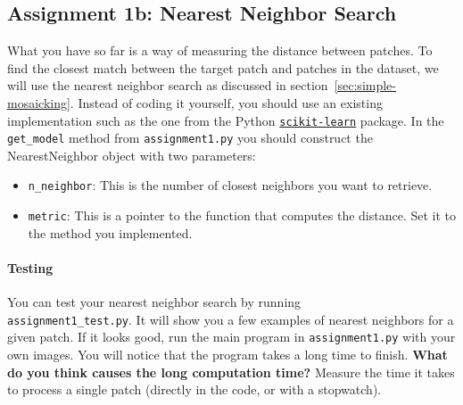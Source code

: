 \documentclass[a4paper]{article}
\begin{document}
	\subsection{Assignment 1b: Nearest Neighbor Search}
		What you have so far is a way of measuring the distance between patches.
		To find the closest match between the target patch and patches in the dataset, we will use the nearest neighbor search as discussed in section~\ref{sec:simple-mosaicking}. 
		Instead of coding it yourself, you should use an existing implementation such as the one from the Python 
		\href{http://scikit-learn.org/stable/modules/neighbors.html}{\texttt{scikit-learn}} package.
		In the \verb|get_model| method from \verb|assignment1.py| you should construct the NearestNeighbor object with two parameters:
		\begin{itemize}
			\item \verb|n_neighbor|: This is the number of closest neighbors you want to retrieve. 
			\item \verb|metric|: This is a pointer to the function that computes the distance. 
			Set it to the method you implemented.
		\end{itemize}
	
		\paragraph{Testing}
		You can test your nearest neighbor search by running \\
		\verb|assignment1_test.py|. 
		It will show you a few examples of nearest neighbors for a given patch.
		If it looks good, run the main program in \verb|assignment1.py| with your own images.
		You will notice that the program takes a long time to finish. 
		\textbf{What do you think causes the long computation time?}
		Measure the time it takes to process a single patch (directly in the code, or with a stopwatch).
	
\end{document}
